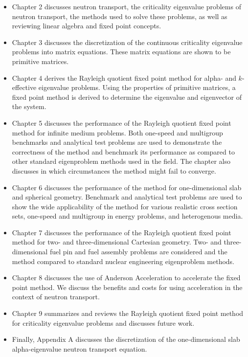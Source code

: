 \begin{itemize}
	\item Chapter 2 discusses neutron transport, the criticality eigenvalue problems of neutron transport, the methods used to solve these problems, as well as reviewing linear algebra and fixed point concepts.
	\item Chapter 3 discusses the discretization of the continuous criticality eigenvalue problems into matrix equations. These matrix equations are shown to be primitive matrices.
	\item Chapter 4 derives the Rayleigh quotient fixed point method for alpha- and $k$-effective eigenvalue problems. Using the properties of primitive matrices, a fixed point method is derived to determine the eigenvalue and eigenvector of the system.
	\item Chapter 5 discusses the performance of the Rayleigh quotient fixed point method for infinite medium problems. Both one-speed and multigroup benchmarks and analytical test problems are used to demonstrate the correctness of the method and benchmark its performance as compared to other standard eigenproblem methods used in the field. The chapter also discusses in which circumstances the method might fail to converge.
	\item Chapter 6 discusses the performance of the method for one-dimensional slab and spherical geometry. Benchmark and analytical test problems are used to show the wide applicability of the method for various realistic cross section sets, one-speed and multigroup in energy problems, and heterogenous media.
	\item Chapter 7 discusses the performance of the Rayleigh quotient fixed point method for two- and three-dimensional Cartesian geometry. Two- and three-dimensional fuel pin and fuel assembly problems are considered and the method compared to standard nuclear engineering eigenproblem methods.
	\item Chapter 8 discusses the use of Anderson Acceleration to accelerate the fixed point method. We discuss the benefits and costs for using acceleration in the context of neutron transport.
	\item Chapter 9 summarizes and reviews the Rayleigh quotient fixed point method for criticality eigenvalue problems and discusses future work.
	\item Finally, Appendix A discusses the discretization of the one-dimensional slab alpha-eigenvalue neutron transport equation.
\end{itemize}